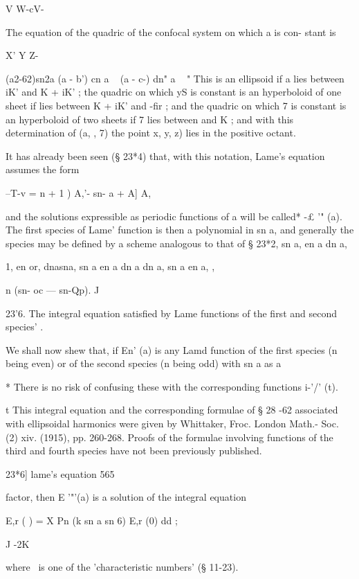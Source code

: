 {{{{{{{V W-cV-

The equation of the quadric of the confocal system on which a is con-
stant is

X' Y Z-

(a2-62)sn2a (a - b') cn a ~ (a - c-) dn" a ~ " This is an ellipsoid if
a lies between iK' and K + iK' ; the quadric on which yS is constant
is an hyperboloid of one sheet if lies between K + iK' and -fir ; and
the quadric on which 7 is constant is an hyperboloid of two sheets if
7 lies between and K ; and with this determination of (a, , 7) the
point x, y, z) lies in the positive octant.

It has already been seen (§ 23*4) that, with this notation, Lame's
equation assumes the form

--T-v = n + 1 ) A,'- sn- a + A] A,

and the solutions expressible as periodic functions of a will be
called* -£ '" (a). The first species of Lame' function is then a
polynomial in sn a, and generally the species may be defined by a
scheme analogous to that of § 23*2, sn a, en a dn a,

1, en or, dnasna, sn a en a dn a dn a, sn a en a, ,



n (sn- oc — sn-Qp). J



23'6. The integral equation satisfied by Lame functions of the first
and second species' .

We shall now shew that, if En' (a) is any Lamd function of the first
species (n being even) or of the second species (n being odd) with sn
a as a

* There is no risk of confusing these with the corresponding functions
i-'/' (t).

t This integral equation and the corresponding formulae of § 28 -62
associated with ellipsoidal harmonics were given by Whittaker, Froc.
London Math.- Soc. (2) xiv. (1915), pp. 260-268. Proofs of the
formulae involving functions of the third and fourth species have not
been previously published.



23*6] lame's equation 565

factor, then E '"'(a) is a solution of the integral equation

E,r ( ) = X Pn (k sn a sn 6) E,r (0) dd ;

J -2K

where \ is one of the 'characteristic numbers' (§ 11-23).

}}}}}}}
